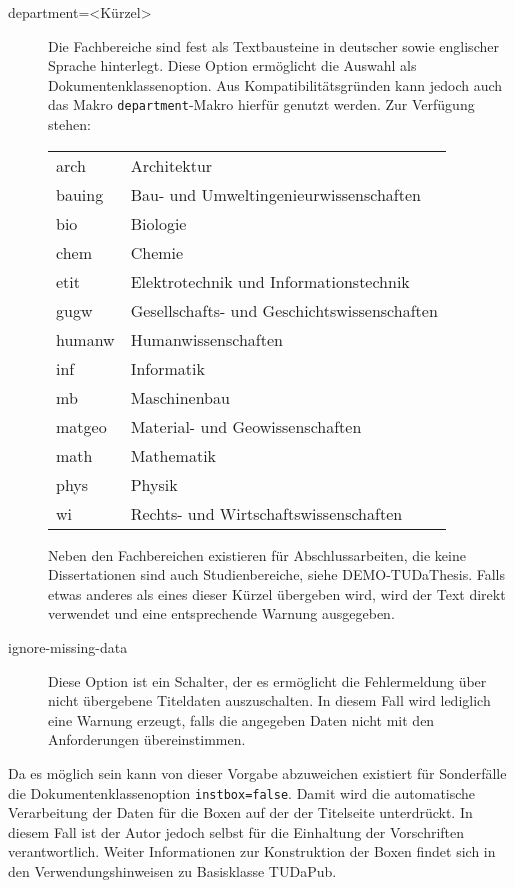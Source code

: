 \documentclass[
	ngerman,
	ruledheaders=chapter,%
	class=book,%
	thesis={
		type=dr,
		dr=rernat
	},
	accentcolor=9c,%
	custommargins=true,%
	marginpar=false,%
	parskip=half-,%
	fontsize=11pt,%
]{tudapub}
\let\code\texttt
\begin{document}
\begin{description}
	\item[department=<Kürzel>] Die Fachbereiche sind fest als Textbausteine in deutscher sowie englischer Sprache hinterlegt. Diese Option ermöglicht die Auswahl als Dokumentenklassenoption. Aus Kompatibilitätsgründen kann jedoch auch das Makro \code{department}-Makro hierfür genutzt werden. Zur Verfügung stehen:\par
	\begin{tabular}{@{}l@{${}\to{}$}l@{}}
		arch  & Architektur\\
		bauing& Bau- und Umweltingenieurwissenschaften\\
		bio   &Biologie\\
		chem  &Chemie\\
		etit  &Elektrotechnik und Informationstechnik\\
		gugw  &Gesellschafts- und Geschichtswissenschaften\\
		humanw&Humanwissenschaften\\
		inf   &Informatik\\
		mb    &Maschinenbau\\
		matgeo&Material- und Geowissenschaften\\
		math  &Mathematik\\
		phys  &Physik\\
		wi    &Rechts- und Wirtschaftswissenschaften
	\end{tabular}
	
	Neben den Fachbereichen existieren für Abschlussarbeiten, die keine Dissertationen sind auch Studienbereiche, siehe DEMO-TUDaThesis.
	Falls etwas anderes als eines dieser Kürzel übergeben wird, wird der Text direkt verwendet und eine entsprechende Warnung ausgegeben.
		
	\item[ignore-missing-data] Diese Option ist ein Schalter, der es ermöglicht die Fehlermeldung über nicht übergebene Titeldaten auszuschalten. In diesem Fall wird lediglich eine Warnung erzeugt, falls die angegeben Daten nicht mit den Anforderungen übereinstimmen.
\end{description}

Da es möglich sein kann von dieser Vorgabe abzuweichen existiert für Sonderfälle die Dokumentenklassenoption \code{instbox=false}. Damit wird die automatische Verarbeitung der Daten für die Boxen auf der der Titelseite unterdrückt. In diesem Fall ist der Autor jedoch selbst für die Einhaltung der Vorschriften verantwortlich. Weiter Informationen zur Konstruktion der Boxen findet sich in den Verwendungshinweisen zu Basisklasse TUDaPub.

\printbibliography
	
\end{document}
